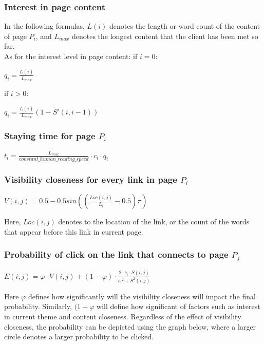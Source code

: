 \documentclass[12pt]{report}
\begin{document}
\subsubsection{Interest in page content}
In the following formulas, \(L(i)\) denotes the length or word count of the content of page \(P_i\), and \(L_{max}\) denotes the longest content that the client has been met so far. \\

As for the interest level in page content:
if \(i = 0\):
\begin{center}
\(q_i = \frac{L(i)}{L_{max}}\)
\end{center}
if \(i > 0\):
\begin{center}
\(q_i = \frac{L(i)}{L_{max}}(1 - S'(i, i - 1))\)
\end{center}

\subsubsection{Staying time for page \(P_i\)}
\begin{center}
\(t_i = \frac{L_{max}}{constant\_human\_reading\_speed}\cdot c_i \cdot q_i\)
\end{center}

\subsubsection{Visibility closeness for every link in page \(P_i\)}
\begin{center}
\(V(i, j) = 0.5 - 0.5sin((\frac{Loc(i,j)}{L_i} - 0.5) \pi)\)
\end{center}
Here, \(Loc(i, j)\) denotes to the location of the link, or the count of the words that appear before this link in current page.

\subsubsection{Probability of click on the link that connects to page \(P_j\)}
\begin{center}
\(E(i, j) = \varphi \cdot V(i,j) + (1 - \varphi) \cdot \frac{2\cdot c_i \cdot S(i,j)}{{c_i}^2 + S^2(i,j)}\)
\end{center}
Here \(\varphi\) defines how significantly will the visibility closeness will impact the final probability. Similarly, \((1-\varphi\) will define how significant of factors such as interest in current theme and content closeness. Regardless of the effect of visibility closeness, the probability can be depicted using the graph below, where a larger circle denotes a larger probability to be clicked.
\end{document}
